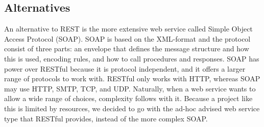 \subsection{Alternatives}
\label{subsec:restAlt}
An alternative to REST is the more extensive web service called Simple Object Access Protocol (SOAP). SOAP is based on the XML-format and the protocol consist of three parts: an envelope that defines the message structure and how this is used, encoding rules, and how to call procedures and responses\cite{DecidingOnRESTful}. SOAP has power over RESTful because it is protocol independent, and it offers a larger range of protocols to work with. RESTful only works with HTTP, whereas SOAP may use HTTP, SMTP, TCP, and UDP. Naturally, when a web service wants to allow a wide range of choices, complexity follows with it. Because a project like this is limited by resources, we decided to go with the ad-hoc advised web service type that RESTful provides, instead of the more complex SOAP\cite{DecidingOnRESTful}.